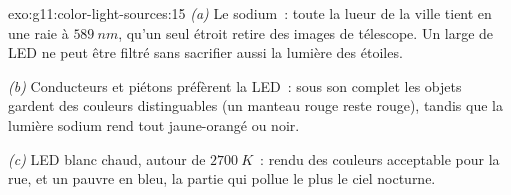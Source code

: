 \begin{solution}{exo:g11:color-light-sources:15}
\emph{(a)} Le sodium~: toute la lueur de la ville tient en une raie à
$\qty{589}{nm}$, qu'un seul 
étroit retire des images de télescope. Un
 large de LED ne peut être filtré sans
sacrifier aussi la lumière des étoiles.

\emph{(b)} Conducteurs et piétons préfèrent la LED~: sous son
 complet les objets gardent des couleurs
distinguables (un manteau rouge reste rouge), tandis que la lumière
sodium rend tout jaune-orangé ou noir.

\emph{(c)} LED blanc chaud, autour de $\qty{2700}{K}$~: rendu des
couleurs acceptable pour la rue, et un
 pauvre en bleu, la partie qui pollue le
plus le ciel nocturne.
\end{solution}


